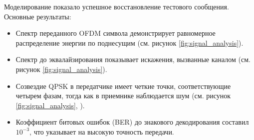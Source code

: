 \documentclass[a4paper,14pt,oneside,openany]{memoir}
\begin{document}
	Моделирование показало успешное восстановление тестового сообщения. Основные результаты:
	\begin{itemize}
		\item Спектр переданного OFDM символа демонстрирует равномерное распределение энергии по поднесущим (см. рисунок \ref{fig:signal_analysis}).
		\item Спектр до эквалайзирования показывает искажения, вызванные каналом (см. рисунок \ref{fig:signal_analysis}).
		\item Созвездие QPSK в передатчике имеет четкие точки, соответствующие четырем фазам, тогда как в приемнике наблюдается шум (см. рисунок \ref{fig:signal_analysis}, ).
		\item Коэффициент битовых ошибок (BER) до знакового декодирования составил $10^{-3}$, что указывает на высокую точность передачи.
	\end{itemize}
	
\end{document}
